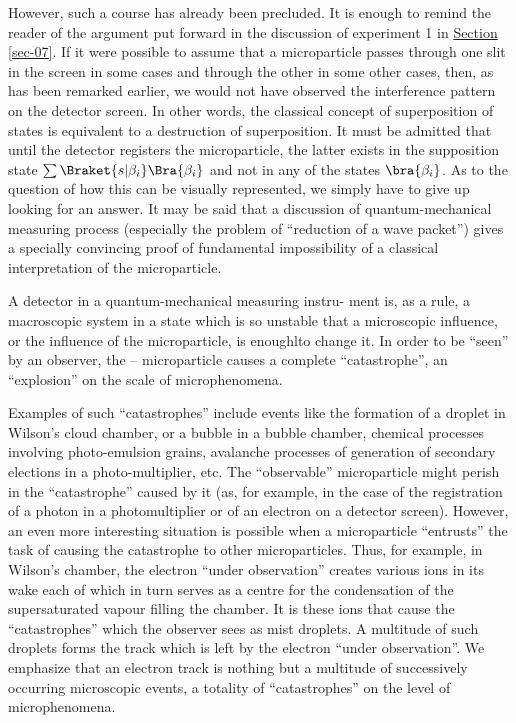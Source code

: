 \documentclass[a4paper,sfsidenotes,colorlinks=true]{tufte-book}
\numberwithin{equation}{section}
\numberwithin{figure}{section}
\begin{document}
However, such a course has already been precluded. It is enough to
remind the reader of the argument put forward in the discussion of
experiment 1 in \hyperref[sec-07]{Section \ref{sec-07}}. If it were
possible to assume that a microparticle passes through one slit in the
screen in some cases and through the other in some other cases, then,
as has been remarked earlier, we would not have observed the
interference pattern on the detector screen. In other words, the
classical concept of superposition of states is equivalent to a
destruction of superposition. It must be admitted that until the
detector registers the microparticle, the latter exists in the
supposition state $\sum \Braket{s|\beta_{i}} \Bra{\beta_{i}}$ and not
in any of the states $\bra{\beta_{i}}$. As to the question of how this
can be visually represented, we simply have to give up looking for an
answer. It may be said that a discussion of quantum-mechanical
measuring process (especially the problem of ``reduction of a wave
packet'') gives a specially convincing proof of fundamental
impossibility of a classical interpretation of the microparticle.


A detector in a quantum-mechanical
measuring instru- ment is, as a rule, a macroscopic system in a state
which is so unstable that a microscopic influence, or the influence
of the microparticle, is enoughlto change it. In order to be ``seen'' by
an observer, the -- microparticle causes a complete ``catastrophe'', an
``explosion'' on the scale of microphenomena.


Examples of such ``catastrophes'' include events like the formation of a droplet in Wilson's cloud chamber, or a bubble in a bubble chamber, chemical processes involving photo-emulsion grains, avalanche processes of generation of secondary elections in a photo-multiplier, etc. The ``observable'' microparticle might perish in the ``catastrophe'' caused by it (as, for example, in the case of the registration of a photon in a photomultiplier or of an electron on a detector screen). However, an even more interesting situation is possible when a microparticle ``entrusts'' the task of causing the catastrophe to other microparticles. Thus, for example, in Wilson's chamber, the electron ``under observation'' creates various ions in its wake each of which in turn serves as a centre for the condensation of the supersaturated vapour filling the chamber. It is these ions that cause the ``catastrophes'' which the observer sees as mist droplets. A multitude of such droplets forms the track which is left by the electron ``under observation''. We emphasize that an electron track is nothing but a multitude of successively occurring microscopic events, a totality of ``catastrophes'' on the level of microphenomena.
\end{document}
